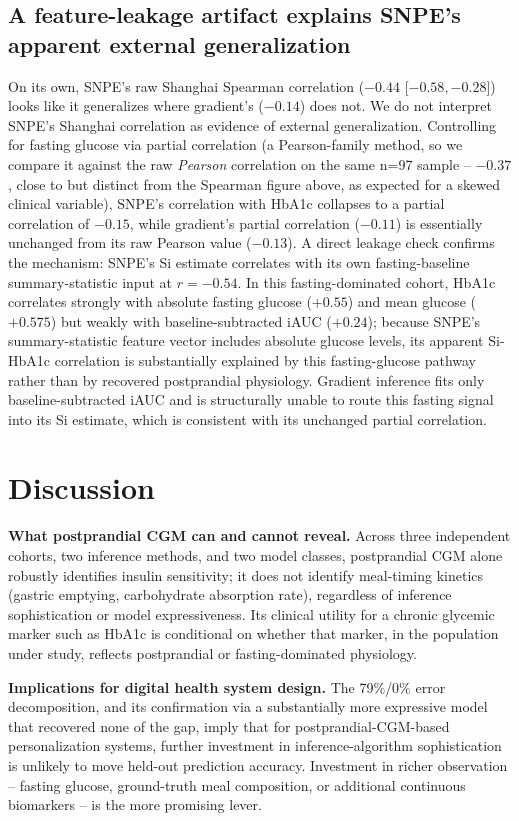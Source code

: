 \documentclass[letterpaper]{article} %
\begin{document}
\subsection{A feature-leakage artifact explains SNPE's apparent external generalization}
\label{sec:tautology}
On its own, SNPE's raw Shanghai Spearman correlation ($-0.44$ [$-0.58,-0.28$]) looks like it
generalizes where gradient's ($-0.14$) does not. We do not interpret SNPE's Shanghai correlation as
evidence of external generalization. Controlling for fasting glucose via partial correlation (a
Pearson-family method, so we compare it against the raw \emph{Pearson} correlation on the same
n=97 sample -- $-0.37$, close to but distinct from the Spearman figure above, as expected for a
skewed clinical variable), SNPE's correlation with HbA1c collapses to a partial correlation of
$-0.15$, while gradient's partial correlation ($-0.11$) is essentially unchanged from its raw
Pearson value ($-0.13$). A direct leakage check confirms the mechanism: SNPE's Si estimate
correlates with its own fasting-baseline summary-statistic input at $r=-0.54$. In this
fasting-dominated cohort, HbA1c
correlates strongly with absolute fasting glucose ($+0.55$) and mean glucose ($+0.575$) but weakly
with baseline-subtracted iAUC ($+0.24$); because SNPE's summary-statistic feature vector includes
absolute glucose levels, its apparent Si-HbA1c correlation is substantially explained by this
fasting-glucose pathway rather than by recovered postprandial physiology. Gradient inference fits
only baseline-subtracted iAUC and is structurally unable to route this fasting signal into its Si
estimate, which is consistent with its unchanged partial correlation.

\section{Discussion}

\textbf{What postprandial CGM can and cannot reveal.} Across three independent cohorts, two
inference methods, and two model classes, postprandial CGM alone robustly identifies insulin
sensitivity; it does not identify meal-timing kinetics (gastric emptying, carbohydrate absorption
rate), regardless of inference sophistication or model expressiveness. Its clinical utility for a
chronic glycemic marker such as HbA1c is conditional on whether that marker, in the population
under study, reflects postprandial or fasting-dominated physiology.

\textbf{Implications for digital health system design.} The 79\%/0\% error decomposition, and its
confirmation via a substantially more expressive model that recovered none of the gap, imply that
for postprandial-CGM-based personalization systems, further investment in inference-algorithm
sophistication is unlikely to move held-out prediction accuracy. Investment in richer observation
-- fasting glucose, ground-truth meal composition, or additional continuous biomarkers -- is the
more promising lever.
\end{document}
